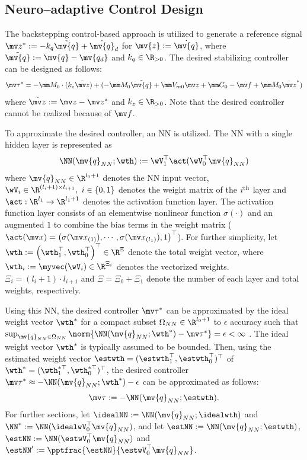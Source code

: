 \documentclass[letterpaper, 10 pt, conference]{ieeeconf}  %
\newcommand*{\q}{\mv{q}}
\newcommand*{\dq}{\dot{\q}}
\newcommand*{\qd}{\mv{q_d}}
\begin{document}
\subsection{Neuro–adaptive Control Design} \label{sec:ctrl dev}

The backstepping control-based approach is utilized to generate a reference signal $\mv z^*:= -{k_q}\tilde {\q}+\dq_d$ for $\mv {z}:= \dq$, where $\tilde {\q}:= \mv {q} - \qd$ and $k_q\in\R_{>0}$.
The desired stabilizing controller can be designed as follows:
\begin{equation}
    \mv \tau^* = 
    -\mm M_0\cdot ({k_z}\tilde {\mv z})
    + 
        ( 
            -\mm M_0\tilde {\q}+\mm V_{m0}{\mv z}+\mm G_0-\mv f+\mm M_0 \dot {\mv z}^*
        )
    \label{eq. desired control}
\end{equation}
where $\tilde {\mv z}:= \mv z-\mv z^*$ and $k_z\in\R_{>0}$.
Note that the desired controller cannot be realized because of $\mv f$.

To approximate the desired controller, an NN is utilized.
The NN with a single hidden layer is represented as 
\begin{equation}
    \NN({\q_{NN}};\wth):= \wV_1^\top \act(\wV_0^\top {\q_{NN}})
\end{equation}
where ${\q_{NN}}\in\R^{l_0+1}$ denotes the NN input vector, $\wV_i\in\R^{(l_i+1)\times l_{i+1}},\ i\in\{0,1\}$ denotes the weight matrix of the $i\textsuperscript{th}$ layer and $\act:\R^{l_1}\to\R^{l_1+1}$ denotes the activation function layer.
The activation function layer consists of an elementwise nonlinear function $\sigma(\cdot)$ and an augmented $1$ to combine the bias terms in the weight matrix (\ie $\act(\mv x) = \left(\sigma(\mv x_{(1)}),\cdots, \sigma(\mv x_{(l_1)}), 1\right)^\top $).
For further simplicity, let $\wth:=\left(\wth_1^\top ,\wth_0^\top \right)^\top \in\R^{\Xi}$ denote the total weight vector, where $\wth_i:= \myvec(\wV_i)\in\R^{\Xi_i}$ denotes the vectorized weights.
$\Xi_i=(l_i+1)\cdot l_{i+1}$ and $\Xi=\Xi_0+\Xi_1$ denote the number of each layer and total weights, respectively.

Using this NN, the desired controller $\mv \tau^*$ can be approximated by the ideal weight vector $\wth^*$ for a compact subset $\Omega_{NN}\in\R^{l_0+1}$ to $\epsilon$ accuracy such that $\sup_{{\q_{NN}}\in\Omega_{NN}} \allowbreak \norm{\NN({\q_{NN}};\wth^*) - \mv \tau^*}=\epsilon<\infty$ \cite{Cybenko:1989aa}.
The ideal weight vector $\wth^*$ is typically assumed to be bounded.
Then, using the estimated weight vector $\estwth=(\estwth_1^\top ,\estwth_0^\top )^\top $ of $\wth^*=(\wth_1^{*\top},\wth_0^{*\top})^\top $, the desired controller $\mv \tau^*\approx -\NN(\q_{NN};\wth^*)-\epsilon$ can be approximated as follows:
\begin{equation}
    \mv \tau := -\NN({\q_{NN}};\estwth)
    .
    \label{eq. control law}
\end{equation}
For further sections, let $\idealNN:=\NN({\q_{NN}};\idealwth)$ and $\NN^* :=\NN({\idealwV}_0^{\top}{\q_{NN}})$, and let $\estNN:={\NN}({\q_{NN}};\estwth)$, $\estNN :=\NN(\estwV_0^{\top}{\q_{NN}})$ and $\estNN' := \pptfrac{\estNN}{\estwV_0^\top \q_{NN}}$.
\end{document}
